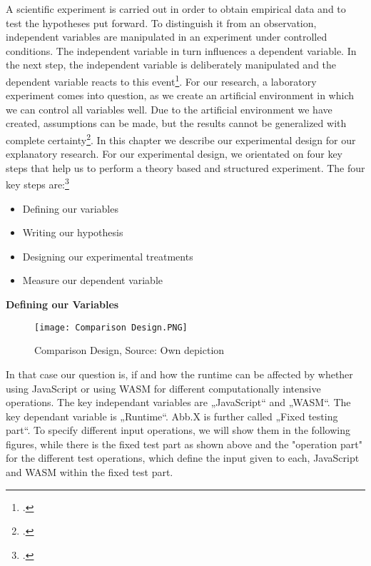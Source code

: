 A scientific experiment is carried out in order to obtain empirical data and to test the hypotheses put forward. To distinguish it from an observation, independent variables are manipulated in an experiment under controlled conditions. The independent variable in turn influences a dependent variable. In the next step, the independent variable is deliberately manipulated and the dependent variable reacts to this event\footcite{genau_experiment_2018}.
For our research, a laboratory experiment comes into question, as we create an artificial environment in which we can control all variables well. Due to the artificial environment we have created, assumptions can be made, but the results cannot be generalized with complete certainty\footcite{genau_experiment_2018}.
In this chapter we describe our experimental design for our explanatory research. 
For our experimental design, we orientated on four key steps that help us to perform a theory based and structured experiment. The four key steps are:\footcite{bevans_guide_2019}\newline
\begin{itemize}
    \item Defining our variables
    \item Writing our hypothesis
    \item Designing our experimental treatments
    \item Measure our dependent variable
\end{itemize}

\textbf{Defining our Variables} \newline

\begin{figure}[H]
    \centering
    \texttt{[image: Comparison Design.PNG]}
    \caption{Comparison Design, Source: Own depiction}
	\label{fig:compdesign}
\end{figure}

In that case our question is, if and how the runtime can be affected by whether using JavaScript or using WASM for different computationally intensive operations. The key independant variables are „JavaScript“ and „WASM“. The key dependant variable is „Runtime“. Abb.X is further called „Fixed testing part“.
To specify different input operations, we will show them in the following figures, while there is the fixed test part as shown above and the "operation part" for the different test operations, which define the input given to each, JavaScript and WASM within the fixed test part.

